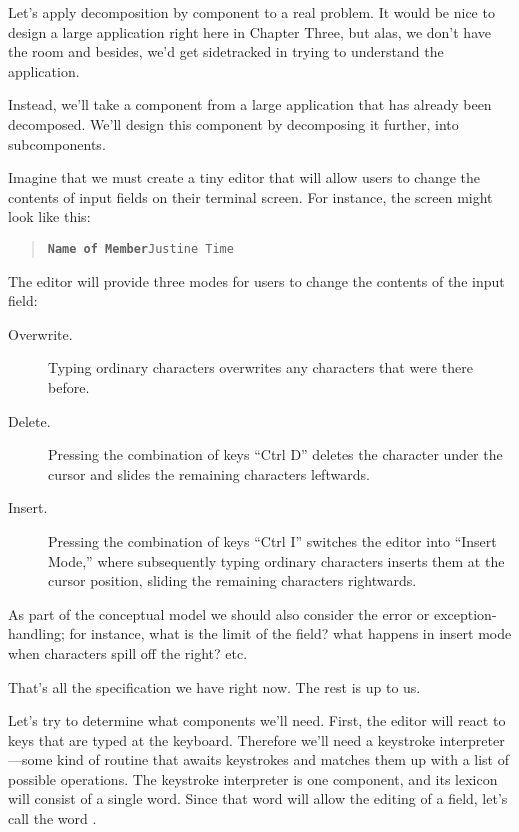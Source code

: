 Let's apply decomposition by component to a real problem. It would be
nice to design a large application right here in Chapter Three, but alas, we
don't have the room and besides, we'd get sidetracked in trying to
understand the application.

Instead, we'll take a component from a large application that has
already been decomposed. We'll design this component by decomposing it
further, into subcomponents.

Imagine that we must create a tiny editor that will allow users to
change the contents of input fields on their terminal screen. For instance,
the screen might look like this:

\begin{quote}
\texttt{\textbf{Name of Member}\hspace{4em}Justine Time}
\end{quote}

The editor will provide three modes for users to change the contents of
the input field:


\begin{description}

\item[Overwrite.] Typing ordinary characters overwrites any characters
that were there before.

\item[Delete.] Pressing the combination of keys ``Ctrl D'' deletes the
character under the cursor and slides the remaining characters
leftwards.

\item[Insert.] Pressing the combination of keys ``Ctrl I'' switches the
editor into ``Insert Mode,'' where subsequently typing ordinary
characters inserts them at the cursor position, sliding the remaining
characters rightwards.

\end{description}


As part of the conceptual model we should also consider the error or
exception-handling; for instance, what is the limit of the field? what
happens in insert mode when characters spill off the right? etc.

That's all the specification we have right now. The rest is up to us.

Let's try to determine what components we'll need. First, the editor
will react to keys that are typed at the keyboard. Therefore we'll
need a keystroke interpreter---some kind of routine that awaits
keystrokes and matches them up with a list of possible operations. The
keystroke interpreter is one component, and its lexicon will consist
of a single word.  Since that word will allow the editing of a field,
let's call the word .

